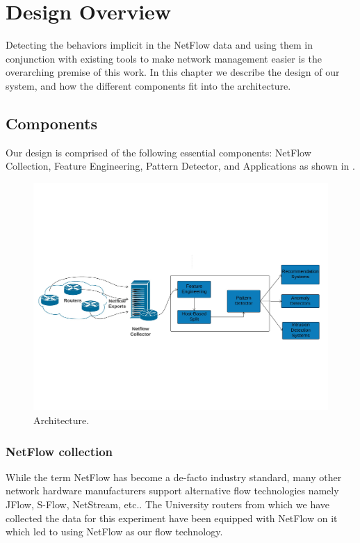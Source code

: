 
\chapter{Design Overview} \label{design}

Detecting the behaviors implicit in the NetFlow data and
using them in conjunction with existing tools to make network management easier is the overarching premise of this work. In this chapter we describe the design of our system, and how the
different components fit into the architecture.

\section{Components}
Our design is comprised of the following essential components: NetFlow Collection, Feature Engineering, Pattern Detector, and
Applications as shown in .
\begin{figure}[t]
	\centerline{\includegraphics[trim=4cm 4cm 4cm 4cm, scale = 0.6]{architecture.pdf}}
	\caption{Architecture.}%
\end{figure}

\subsection{NetFlow collection}
While the term NetFlow has become a de-facto industry standard, many other network hardware manufacturers support alternative flow technologies namely JFlow, S-Flow, NetStream, etc.. The University routers from which we have collected the data for this experiment have been equipped with NetFlow on it which led to using NetFlow as our flow technology. 
